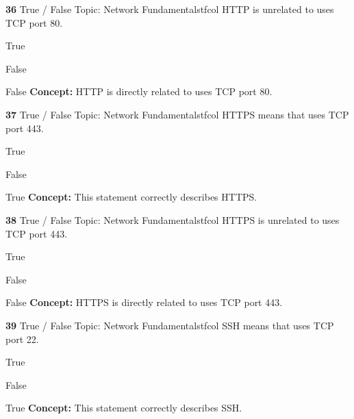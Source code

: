 \documentclass[10pt,a4paper]{article}
\begin{document}
\begin{qcard}{\color{white}\textbf{36} \hfill \small True / False \textbar{} Topic: Network Fundamentals}{tfcol}
HTTP is unrelated to uses TCP port 80.

\begin{qoptions}
\item True
\item False
\end{qoptions}
\begin{explainbox}{False}
\textbf{Concept:} HTTP is directly related to uses TCP port 80.
\end{explainbox}
\end{qcard}

\begin{qcard}{\color{white}\textbf{37} \hfill \small True / False \textbar{} Topic: Network Fundamentals}{tfcol}
HTTPS means that uses TCP port 443.

\begin{qoptions}
\item True
\item False
\end{qoptions}
\begin{explainbox}{True}
\textbf{Concept:} This statement correctly describes HTTPS.
\end{explainbox}
\end{qcard}

\begin{qcard}{\color{white}\textbf{38} \hfill \small True / False \textbar{} Topic: Network Fundamentals}{tfcol}
HTTPS is unrelated to uses TCP port 443.

\begin{qoptions}
\item True
\item False
\end{qoptions}
\begin{explainbox}{False}
\textbf{Concept:} HTTPS is directly related to uses TCP port 443.
\end{explainbox}
\end{qcard}

\begin{qcard}{\color{white}\textbf{39} \hfill \small True / False \textbar{} Topic: Network Fundamentals}{tfcol}
SSH means that uses TCP port 22.

\begin{qoptions}
\item True
\item False
\end{qoptions}
\begin{explainbox}{True}
\textbf{Concept:} This statement correctly describes SSH.
\end{explainbox}
\end{qcard}
\end{document}
